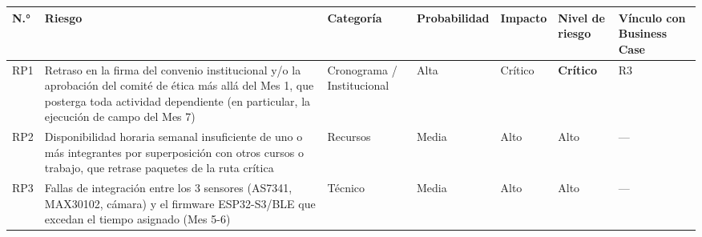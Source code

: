 \documentclass[11pt,a4paper]{article}
\begin{document}
{\small
\begin{longtable}[]{@{}
  >{\raggedright\arraybackslash}p{}
  >{\raggedright\arraybackslash}p{}
  >{\raggedright\arraybackslash}p{}
  >{\raggedright\arraybackslash}p{}
  >{\raggedright\arraybackslash}p{}
  >{\raggedright\arraybackslash}p{}
  >{\raggedright\arraybackslash}p{}@{}}
\toprule\noalign{}
\begin{minipage}[b]{\linewidth}\raggedright
N.°
\end{minipage} & \begin{minipage}[b]{\linewidth}\raggedright
Riesgo
\end{minipage} & \begin{minipage}[b]{\linewidth}\raggedright
Categoría
\end{minipage} & \begin{minipage}[b]{\linewidth}\raggedright
Probabilidad
\end{minipage} & \begin{minipage}[b]{\linewidth}\raggedright
Impacto
\end{minipage} & \begin{minipage}[b]{\linewidth}\raggedright
Nivel de riesgo
\end{minipage} & \begin{minipage}[b]{\linewidth}\raggedright
Vínculo con Business Case
\end{minipage} \\
\midrule\noalign{}
\endhead
\bottomrule\noalign{}
\endlastfoot
RP1 & Retraso en la firma del convenio institucional y/o la aprobación del comité de ética más allá del Mes 1, que posterga toda actividad dependiente (en particular, la ejecución de campo del Mes 7) & Cronograma / Institucional & Alta & Crítico & \textbf{Crítico} & R3 \\
RP2 & Disponibilidad horaria semanal insuficiente de uno o más integrantes por superposición con otros cursos o trabajo, que retrase paquetes de la ruta crítica & Recursos & Media & Alto & Alto & --- \\
RP3 & Fallas de integración entre los 3 sensores (AS7341, MAX30102, cámara) y el firmware ESP32-S3/BLE que excedan el tiempo asignado (Mes 5-6) & Técnico & Media & Alto & Alto & --- \\

\end{longtable}}
\end{document}
